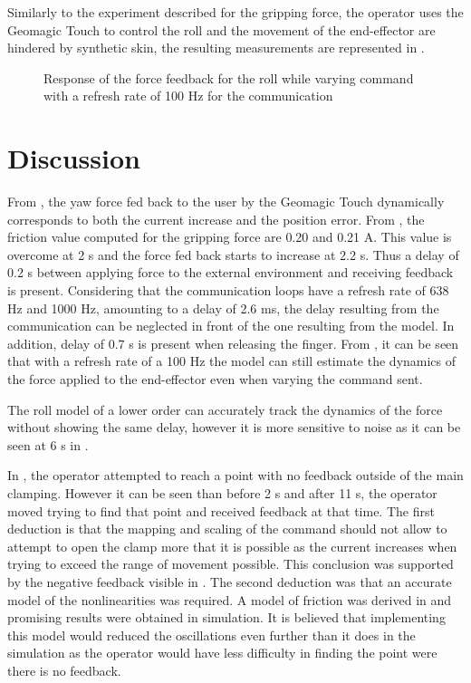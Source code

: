 Similarly to the experiment described for the gripping force, the operator uses the Geomagic Touch to control the roll and the movement of the end-effector are hindered by synthetic skin, the resulting measurements are represented in .
\begin{figure}[H]
  
  \caption{Response of the force feedback for the roll while varying command with a refresh rate of 100 Hz for the communication}
  \label{fig:fbkm_roll_100}
\end{figure}




\section{Discussion}


From , the yaw force fed back to the user by the Geomagic Touch dynamically corresponds to both the current increase and the position error. From , the friction value computed for the gripping force are 0.20 and 0.21 A. This value is overcome at 2 s and the force fed back starts to increase at 2.2 s. Thus a delay of 0.2 s between applying force to the external environment and receiving feedback is present. Considering that the communication loops have a refresh rate of 638 Hz and 1000 Hz, amounting to a delay of 2.6 ms, the delay resulting from the communication can be neglected in front of the one resulting from the model. In addition, delay of 0.7 s is present when releasing the finger.
From , it can be seen that with a refresh rate of a 100 Hz the model can still estimate the dynamics of the force applied to the end-effector even when varying the command sent.

The roll model of a lower order can accurately track the dynamics of the force without showing the same delay, however it is more sensitive to noise as it can be seen at 6 s in .


In , the operator attempted to reach a point with no feedback outside of the main clamping. However it can be seen than before 2 s and after 11 s, the operator moved trying to find that point and received feedback at that time. The first deduction is that the mapping and scaling of the command should not allow to attempt to open the clamp more that it is possible as the current increases when trying to exceed the range of movement possible. This conclusion was supported by the negative feedback visible in . The second deduction was that an accurate model of the nonlinearities was required. A model of friction was derived in  and promising results were obtained in simulation. It is believed that implementing this model would reduced the oscillations even further than it does in the simulation as the operator would have less difficulty in finding the point were there is no feedback.

